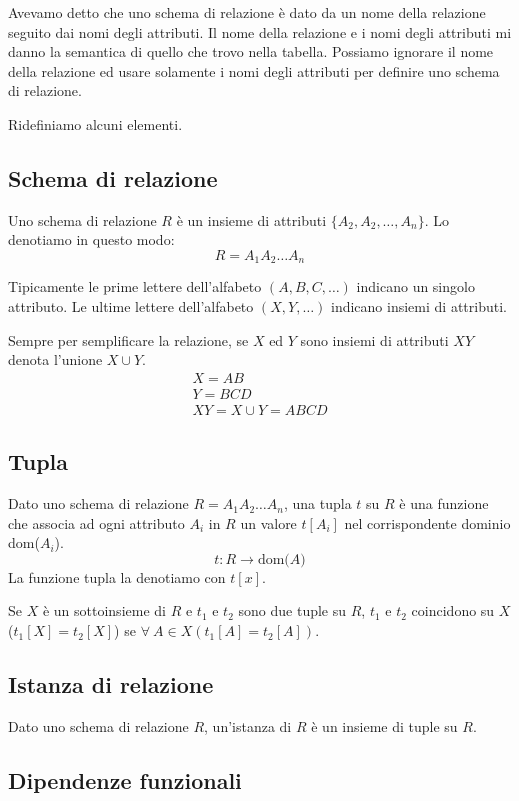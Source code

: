 Avevamo detto che uno schema di relazione \`e dato da un nome della relazione seguito dai nomi degli attributi. Il nome della relazione e i nomi degli attributi mi danno la semantica di quello che trovo nella tabella. Possiamo ignorare il nome della relazione ed usare solamente i nomi degli attributi per definire uno schema di relazione.

Ridefiniamo alcuni elementi.

\subsection{Schema di relazione}

Uno schema di relazione $R$ \`e un insieme di attributi $\{ A_2, A_2, \dots, A_n \}$. Lo denotiamo in questo modo:
\[
R = A_1 A_2 \dots A_n
\]

Tipicamente le prime lettere dell'alfabeto $(A,B,C, \dots)$ indicano un singolo attributo. Le ultime lettere dell'alfabeto $(X, Y, \dots)$ indicano insiemi di attributi.

Sempre per semplificare la relazione, se $X$ ed $Y$ sono insiemi di attributi $XY$ denota l'unione $X \cup Y$.
\begin{gather*}
X = AB \\
Y = BCD \\
XY = X \cup Y = ABCD
\end{gather*}

\subsection{Tupla}

Dato uno schema di relazione $R = A_1 A_2 \dots A_n$, una tupla $t$ su $R$ \`e una funzione che associa ad ogni attributo $A_i$ in $R$ un valore $t[A_i]$ nel corrispondente dominio dom($A_i$).
\[
t : R \to \text{dom($A$)}
\]
La funzione tupla la denotiamo con $t[x]$.

Se $X$ \`e un sottoinsieme di $R$ e $t_1$ e $t_2$ sono due tuple su $R$, $t_1$ e $t_2$ coincidono su $X$ ($t_1[X] = t_2[X]$) se $\forall \ A \in X (t_1[A] = t_2[A])$.

\subsection{Istanza di relazione}

Dato uno schema di relazione $R$, un'istanza di $R$ \`e un insieme di tuple su $R$.

\subsection{Dipendenze funzionali}

